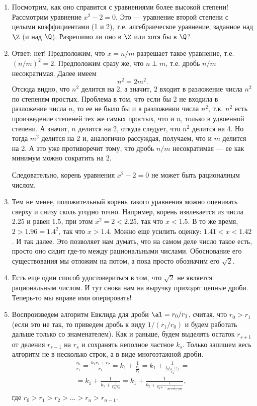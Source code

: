 \begin{enumerate}
\item Посмотрим, как оно справится с уравнениями более высокой степени! Рассмотрим уравнение $x^2-2=0$. Это --- уравнение второй степени с целыми коэффициентами (1 и 2), т.е. алгебраическое уравнение, заданное над $\Z$ (и над $\Q$). Разрешимо ли оно в $\Z$ или хотя бы в $\Q$?
\item Ответ: нет! Предположим, что $x=n/m$ разрешает такое уравнение, т.е. $(n/m)^2=2$. Предположим сразу же, что $n\perp m$, т.е. дробь $n/m$ несократимая. Далее имеем
$$
n^2=2m^2.
$$
Отсюда видно, что $n^2$ делится на 2, а значит, $2$ входит в разложение числа $n^2$ по степеням простых. Проблема в том, что если бы 2 не входила в разложение числа $n$, то ее не было бы и в разложении числа $n^2$, т.к. $n^2$ есть произведение степеней тех же самых простых, что и $n$, только в удвоенной степени. А значит, $n$ делится на 2, откуда следует, что $n^2$ делится на 4. Но тогда $m^2$ делится на 2 и, аналогично рассуждая, получаем, что и $m$ делится на 2. А это уже противоречит тому, что дробь $n/m$ несократимая --- ее как минимум можно сократить на 2.

Следовательно, корень уравнения $x^2-2=0$ не может быть рационалным числом.

\item Тем не менее, положительный корень такого уравнения можно оценивать сверху и снизу сколь угодно точно. Например, корень извлекается из числа 2.25 и равен 1.5, при этом $x^2=2<2.25$, так что $x<1.5$. В то же время, $2>1.96=1.4^2$, так что $x>1.4$. Можно еще усилить оценку: $1.41<x<1.42$. И так далее. Это позволяет нам думать, что на самом деле число такое есть, просто оно сидит где-то между рациональными числами. Обоснование его существования мы отложим на потом, а пока просто обозначим его $\sqrt 2$.
\item Есть еще один способ удостовериться в том, что $\sqrt 2$ не является рациональным числом. И тут снова нам на выручку приходят цепные дроби. Теперь-то мы вправе ими оперировать!

\item Воспроизведем алгоритм Евклида для дроби $\al = r_0/r_1$, считая, что $r_0>r_1$ (если это не так, то приведем дробь к виду $1/(r_1/r_0)$ и будем работать дальше только со знаменателем). Как и раньше, будем выделять остаток $r_{s+1}$ от деления $r_{s-1}$ на $r_s$ и сохранять неполное частное $k_s$. Только запишем весь алгоритм не в несколько строк, а в виде многоэтажной дроби. 
\begin{multline*}
\frac{r_0}{r_1} = \frac{k_1r_1+r_2}{r_1} = \boxed{k_1}+\frac{1}{\frac{r_1}{r_2}} =
\boxed{k_1} + \frac{1}{\frac{k_2r_2+r_3}{r_2}} =  \\
= \boxed{k_1} + \frac{1}{\boxed{k_2} + \frac{1}{r_3/r_2}} = 
\boxed{k_1} + \frac{1}{\boxed{k_2} + \frac{1}{\boxed{k_3} + \ddots \frac{1}{\boxed{k_n}+r_{n+1}/r_n}}},
\end{multline*}
где $r_0>r_1>r_2>\dots>r_n>r_{n-1}$.


\end{enumerate}
